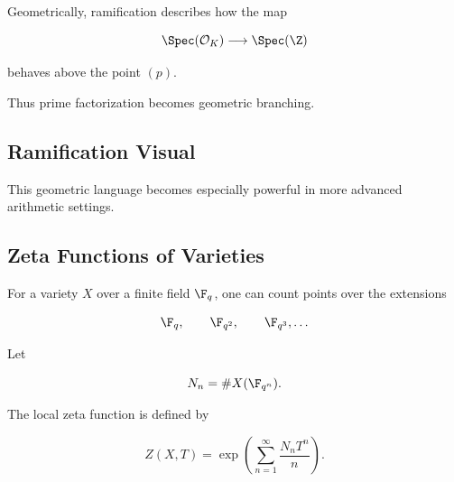 Geometrically, ramification describes how the map

\[ \Spec(\mathcal O_K)\longrightarrow\Spec(\Z) \]

behaves above the point \((p)\).

Thus prime factorization becomes geometric branching.

\subsection{Ramification Visual}
\label{subsec:ramification-visual-arithmetic}

\begin{centereddiagram}
\end{centereddiagram}

This geometric language becomes especially powerful in more advanced
arithmetic settings.

\subsection{Zeta Functions of Varieties}
\label{subsec:zeta-functions-varieties}

For a variety \(X\) over a finite field \(\F_q\), one can count points over
the extensions

\[ \F_q,\qquad\F_{q^2},\qquad\F_{q^3},\ldots \]

Let

\[ N_n=\#X(\F_{q^n}). \]

The local zeta function is defined by

\[ \boxed{
Z(X,T)=
\exp\left(
\sum_{n=1}^{\infty}\frac{N_nT^n}{n}
\right).
} \]

